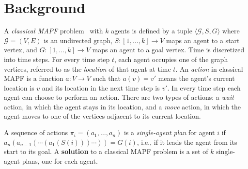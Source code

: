 \documentclass[review]{elsarticle}
\newcommand{\target}{\ensuremath{G}\xspace}
\newcommand{\source}{\ensuremath{S}\xspace}
\newcommand\konstantin[1]{\nb{\textbf{Konstantin:}}{red}{#1}}
\newcommand\roni[1]{\nb{\textbf{Roni:}}{green}{#1}}
\newcommand\dor[1]{\nb{\textbf{Dor:}}{Fuchsia}{#1}}
\begin{document}
\section{Background}

%


A \emph{classical MAPF} problem~\cite{stern2019mapf} with $k$ agents is defined by 
a tuple $\langle \mathcal{G}, \source,\target \rangle$ 
where $\mathcal{G}=(V,E)$ is an undirected graph, 
$\source:[1,\ldots,k]\rightarrow V$ maps an agent to a start vertex, 
and $\target:[1,\ldots,k]\rightarrow V$ maps an agent to a goal vertex. 
Time is discretized into time steps. 
For every time step $t$, each agent occupies one of the graph vertices, referred to as the \emph{location} of that agent at time $t$.
An \emph{action} in classical MAPF is a function $a: V\rightarrow V$ 
such that $a(v)=v'$ means the agent's current location is $v$ and its location in the next time step is $v'$. %
In every time step each agent can choose to perform an action. 
There are two types of actions: a \emph{wait} action, in which the agent stays in its location, and a \emph{move} action, in which the agent moves to one of the vertices adjacent to its current location. 




A sequence of actions $\pi_i=(a_1,\ldots,a_n)$ 
is a \emph{single-agent plan} for agent $i$ 
if $a_n(a_{n-1}(\cdots(a_1(\source(i)))\cdots))=\target(i)$, i.e., if it leads the agent from its start to its goal. A \textbf{solution} to a classical MAPF problem is a set of $k$ single-agent plans, one for each agent.  

\end{document}
